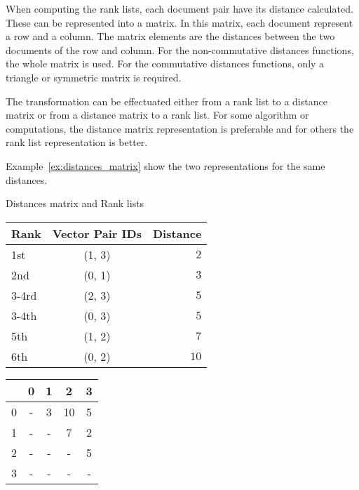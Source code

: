 When computing the rank lists, each document pair have its distance calculated.
These can be represented into a matrix.
In this matrix, each document represent a row and a column.
The matrix elements are the distances between the two documents of the row and column.
For the non-commutative distances functions, the whole matrix is used.
For the commutative distances functions, only a triangle or symmetric matrix is required.

The transformation can be effectuated either from a rank list to a distance matrix or from a distance matrix to a rank list.
For some algorithm or computations, the distance matrix representation is preferable and for others the rank list representation is better.

Example~\ref{ex:distances_matrix} show the two representations for the same distances.

\begin{example}
  \centering
  \caption{Distances matrix and Rank lists}
  \label{ex:distances_matrix}
  \begin{subexample}{\linewidth}
    \centering
    \begin{tabular}{l c r}
      \toprule
      Rank & Vector Pair IDs & Distance \\
      \midrule
      1st   & (1, 3) & $2$ \\
      2nd   & (0, 1) & $3$ \\
      3-4rd & (2, 3) & $5$ \\
      3-4th & (0, 3) & $5$ \\
      5th   & (1, 2) & $7$ \\
      6th   & (0, 2) & $10$ \\
      \bottomrule
    \end{tabular}
  \end{subexample}

  \vspace{0.5cm}

  \begin{subexample}{\linewidth}
    \centering
    \begin{tabular}{c|c c c c}
      \toprule
        & 0 & 1 & 2  & 3 \\
      \midrule
      0 & - & 3 & 10 & 5 \\
      1 & - & - & 7  & 2 \\
      2 & - & - & -  & 5 \\
      3 & - & - & -  & - \\
      \bottomrule
    \end{tabular}
  \end{subexample}
\end{example}

